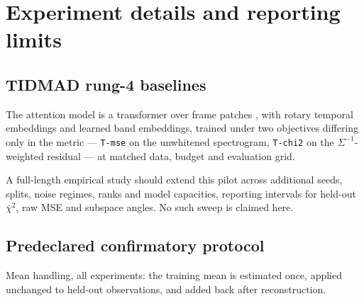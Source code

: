 \section{Experiment details and reporting limits}



\subsection{TIDMAD rung-4 baselines}
\label{app:rung4-baselines}



The attention model is a transformer \citep{vaswani2017attention} over frame patches \citep{nie2023patchtst}, with rotary temporal embeddings \citep{su2024roformer} and learned band embeddings, trained under two objectives differing only in the metric --- \texttt{T-mse} on the unwhitened spectrogram, \texttt{T-chi2} on the $\Sigma^{-1}$-weighted residual --- at matched data, budget and evaluation grid.

A full-length empirical study should extend this pilot across additional seeds, splits, noise regimes, ranks and model capacities, reporting intervals for held-out $\bar\chi^2$, raw MSE and subspace angles. No such sweep is claimed here.

\subsection{Predeclared confirmatory protocol}
\label{app:protocol}
Mean handling, all experiments: the training mean is estimated once, applied unchanged to held-out observations, and added back after reconstruction.

